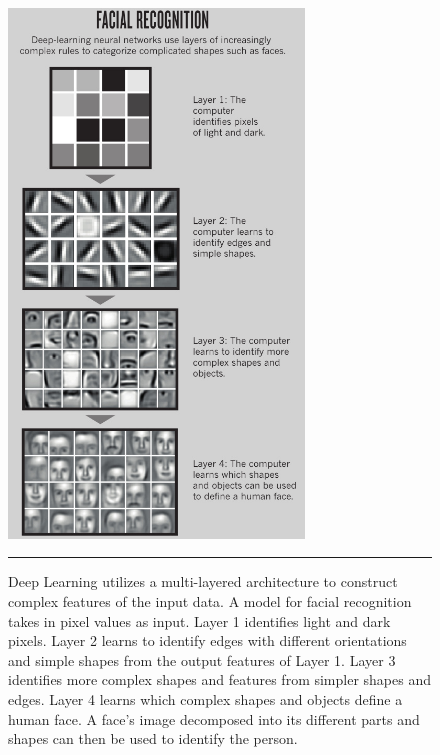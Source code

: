 \begin{figure}[htbp]
	\centering
		\includegraphics[width = 0.7\textwidth]{./Figures/learning_complex_features_the_learning_machine_nature.jpg}
		\rule{35em}{0.5pt}
	\caption[Learning Complex Features]{Deep Learning utilizes a multi-layered architecture to construct complex features of the input data. A model for facial recognition takes in pixel values as input. Layer 1 identifies light and dark pixels. Layer 2 learns to identify edges with different orientations and simple shapes from the output features of Layer 1. Layer 3 identifies more complex shapes and features from simpler shapes and edges. Layer 4 learns which complex shapes and objects define a human face. A face's image decomposed into its different parts and shapes can then be used to identify the person.}
	\label{fig:learning_complex_features}
\end{figure}
